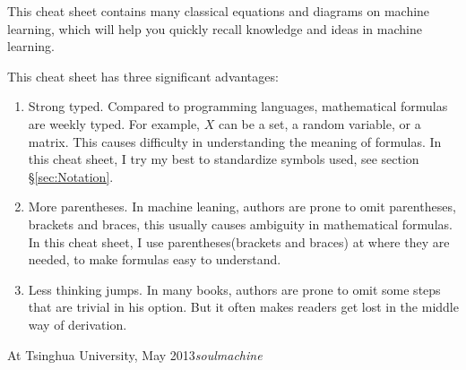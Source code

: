 %
%

\preface

This cheat sheet contains many classical equations and diagrams on machine learning, which will help you quickly recall knowledge and ideas in machine learning.

This cheat sheet has three significant advantages:
\begin{enumerate}
\item Strong typed. Compared to programming languages, mathematical formulas are weekly typed. For example, $X$ can be a set, a random variable, or a matrix. This causes difficulty in understanding the meaning of formulas. In this cheat sheet, I try my best to standardize symbols used, see section \S \ref{sec:Notation}.
\item More parentheses. In machine leaning, authors are prone to omit parentheses, brackets and braces,  this usually causes ambiguity in mathematical formulas. In this cheat sheet, I use parentheses(brackets and braces) at where they are needed, to make formulas easy to understand.
\item Less thinking jumps. In many books, authors are prone to omit some steps that are trivial in his option. But it often makes readers get lost in the middle way of derivation.
\end{enumerate}

\vspace{\baselineskip}
\begin{flushright}\noindent
At Tsinghua University, May 2013\hfill {\it soulmachine} \\
\end{flushright}


